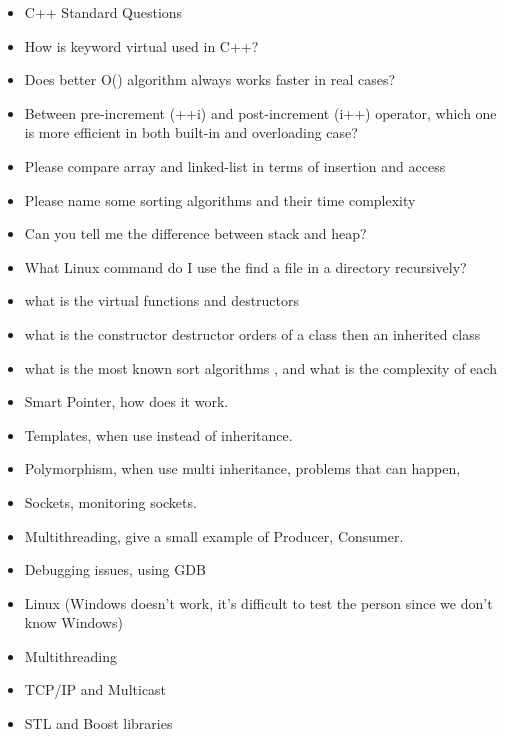 \documentclass[a4paper, 10pt]{article}
\begin{document}
\begin{itemize}
\item C++ Standard Questions
\item How is keyword virtual used in C++?
\item Does better O() algorithm always works faster in real cases?
\item Between pre-increment (++i)  and post-increment (i++) operator, which one is more efficient in both built-in and overloading case?
\item Please compare array and linked-list in terms of insertion and access
\item Please name some sorting algorithms and their time complexity
\item Can you tell me the difference between stack and heap?
\item What Linux command do I use the find a file in a directory recursively?
\item what is the virtual functions and destructors
\item what is the constructor destructor orders of a class then an inherited class
\item what is the most known sort algorithms , and what is the complexity of each
\item Smart Pointer, how does it work.
\item Templates, when use instead of inheritance.
\item Polymorphism, when use multi inheritance, problems that can happen,
\item Sockets, monitoring sockets.
\item Multithreading, give a small example of Producer, Consumer.
\item Debugging issues, using GDB
\item Linux (Windows doesn’t work, it’s difficult to test the person since we don’t know Windows)
\item Multithreading
\item TCP/IP and Multicast
\item STL and Boost libraries
\end{itemize}
\end{document}
